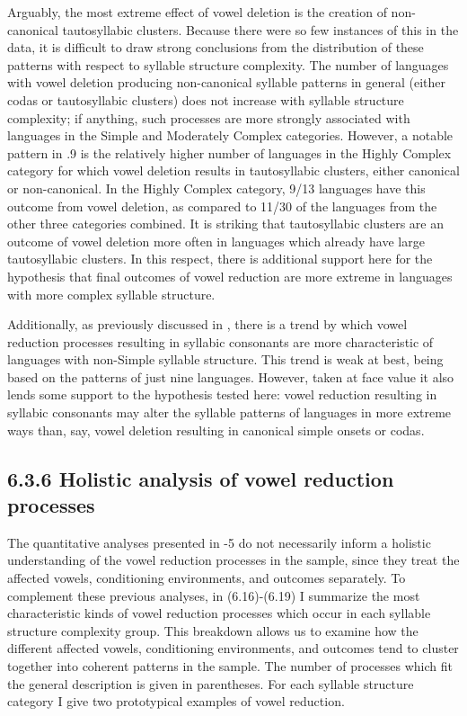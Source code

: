   Arguably, the most extreme effect of vowel deletion is the creation of non-canonical tautosyllabic clusters. Because there were so few instances of this in the data, it is difficult to draw strong conclusions from the distribution of these patterns with respect to syllable structure complexity. The number of languages with vowel deletion producing non-canonical syllable patterns in general (either codas or tautosyllabic clusters) does not increase with syllable structure complexity; if anything, such processes are more strongly associated with languages in the Simple and Moderately Complex categories. However, a notable pattern in .9 is the relatively higher number of languages in the Highly Complex category for which vowel deletion results in tautosyllabic clusters, either canonical or non-canonical. In the Highly Complex category, 9/13 languages have this outcome from vowel deletion, as compared to 11/30 of the languages from the other three categories combined. It is striking that tautosyllabic clusters are an outcome of vowel deletion more often in languages which already have large tautosyllabic clusters. In this respect, there is additional support here for the hypothesis that final outcomes of vowel reduction are more extreme in languages with more complex syllable structure.   

  Additionally, as previously discussed in , there is a trend by which vowel reduction processes resulting in syllabic consonants are more characteristic of languages with non-Simple syllable structure. This trend is weak at best, being based on the patterns of just nine languages. However, taken at face value it also lends some support to the hypothesis tested here: vowel reduction resulting in syllabic consonants may alter the syllable patterns of languages in more extreme ways than, say, vowel deletion resulting in canonical simple onsets or codas.

\subsection{6.3.6 Holistic analysis of vowel reduction processes}

  The quantitative analyses presented in -5 do not necessarily inform a holistic understanding of the vowel reduction processes in the sample, since they treat the affected vowels, conditioning environments, and outcomes separately. To complement these previous analyses, in (6.16)-(6.19) I summarize the most characteristic kinds of vowel reduction processes which occur in each syllable structure complexity group. This breakdown allows us to examine how the different affected vowels, conditioning environments, and outcomes tend to cluster together into coherent patterns in the sample. The number of processes which fit the general description is given in parentheses. For each syllable structure category I give two prototypical examples of vowel reduction.


